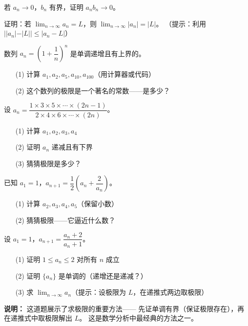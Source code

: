 \begin{exercise}[5]
若 \(a_n \to 0\)，\(b_n\) 有界，证明 \(a_n b_n \to 0\)。
\end{exercise}

\begin{exercise}[5]
证明：若 \(\displaystyle\lim_{n\to\infty} a_n = L\)，则 \(\displaystyle\lim_{n\to\infty} |a_n| = |L|\)。
（提示：利用 \(||a_n| - |L|| \le |a_n - L|\)）
\end{exercise}


\begin{exercise}[6]
数列 \(a_n = \left(1 + \dfrac{1}{n}\right)^n\) 是单调递增且有上界的。
\begin{enumerate}
  \item[(1)] 计算 \(a_1, a_2, a_5, a_{10}, a_{100}\)（用计算器或代码）
  \item[(2)] 这个数列的极限是一个著名的常数——是多少？
\end{enumerate}
\end{exercise}

\begin{exercise}[6]
设 \(a_n = \dfrac{1 \times 3 \times 5 \times \cdots \times (2n-1)}{2 \times 4 \times 6 \times \cdots \times (2n)}\)。
\begin{enumerate}
  \item[(1)] 计算 \(a_1, a_2, a_3, a_4\)
  \item[(2)] 证明 \(a_n\) 递减且有下界
  \item[(3)] 猜猜极限是多少？
\end{enumerate}
\end{exercise}

\begin{exercise}[6]
已知 \(a_1 = 1\)，\(a_{n+1} = \dfrac{1}{2}\left(a_n + \dfrac{2}{a_n}\right)\)。
\begin{enumerate}
  \item[(1)] 计算 \(a_2, a_3, a_4, a_5\)（保留小数）
  \item[(2)] 猜猜极限——它逼近什么数？
\end{enumerate}
\end{exercise}


\begin{exercise}[7]
设 \(a_1 = 1\)，\(a_{n+1} = \dfrac{a_n + 2}{a_n + 1}\)。
\begin{enumerate}
  \item[(1)] 证明 \(1 \le a_n \le 2\) 对所有 \(n\) 成立
  \item[(2)] 证明 \(\{a_n\}\) 是单调的（递增还是递减？）
  \item[(3)] 求 \(\displaystyle\lim_{n\to\infty} a_n\)（提示：设极限为 \(L\)，在递推式两边取极限）
\end{enumerate}

\textbf{说明：} 这道题展示了求极限的重要方法——
先证单调有界（保证极限存在），再在递推式中取极限解出 \(L\)。
这是数学分析中最经典的方法之一。
\end{exercise}
